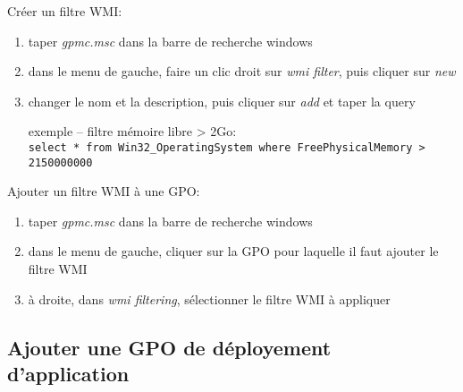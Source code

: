 \documentclass[a4paper]{article}
\begin{document}
Créer un filtre WMI:
\begin{enumerate}
    \item taper \textit{gpmc.msc} dans la barre de recherche windows
    \item dans le menu de gauche, faire un clic droit sur \textit{wmi filter}, puis cliquer sur \textit{new}
    \item changer le nom et la description, puis cliquer sur \textit{add} et taper la query
    \begin{example}
        exemple -- filtre mémoire libre > 2Go: \\
        \texttt{select * from Win32\_OperatingSystem where FreePhysicalMemory > 2150000000}
    \end{example}
\end{enumerate}
Ajouter un filtre WMI à une GPO:
\begin{enumerate}
    \item taper \textit{gpmc.msc} dans la barre de recherche windows
    \item dans le menu de gauche, cliquer sur la GPO pour laquelle il faut ajouter le filtre WMI
    \item à droite, dans \textit{wmi filtering}, sélectionner le filtre WMI à appliquer
\end{enumerate}





\subsection{Ajouter une GPO de déployement d'application}
\end{document}
